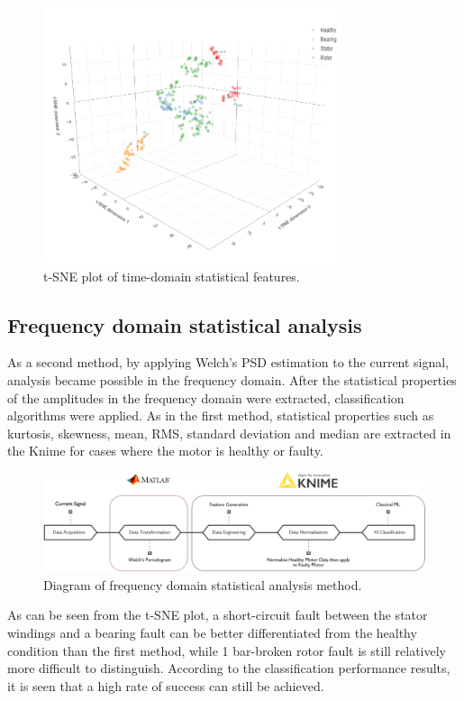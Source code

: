\begin{figure}[h]
	\centering
	\includegraphics[width=250pt,keepaspectratio=true]{./fig/sne_current.PNG}
	\caption{t-SNE plot of time-domain statistical features.}	
	\label{snec}
\end{figure}
\pagebreak
\subsection{Frequency domain statistical analysis}

As a second method, by applying Welch's PSD estimation to the current signal, analysis became possible in the frequency domain. After the statistical properties of the amplitudes in the frequency domain were extracted, classification algorithms were applied. As in the first method, statistical properties such as kurtosis, skewness, mean, RMS, standard deviation and median are extracted in the Knime for cases where the motor is healthy or faulty.

\begin{figure}[h]
	\centering
	\includegraphics[width=400pt,keepaspectratio=true]{./fig/method2.PNG}
	\caption{Diagram of frequency domain statistical analysis method.}	
	\label{method2}
\end{figure}

As can be seen from the t-SNE plot, a short-circuit fault between the stator windings and a bearing fault can be better differentiated from the healthy condition than the first method, while 1 bar-broken rotor fault is still relatively more difficult to distinguish. According to the classification performance results, it is seen that a high rate of success can still be achieved.

